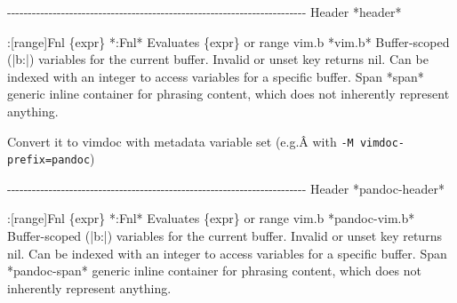 \documentclass[
]{article}
\newenvironment{Shaded}{}{}
\newcommand{\NormalTok}[1]{#1}
\begin{document}
\begin{Shaded}
\begin{Highlighting}[]
\NormalTok{{-}{-}{-}{-}{-}{-}{-}{-}{-}{-}{-}{-}{-}{-}{-}{-}{-}{-}{-}{-}{-}{-}{-}{-}{-}{-}{-}{-}{-}{-}{-}{-}{-}{-}{-}{-}{-}{-}{-}{-}{-}{-}{-}{-}{-}{-}{-}{-}{-}{-}{-}{-}{-}{-}{-}{-}{-}{-}{-}{-}{-}{-}{-}{-}{-}{-}{-}{-}{-}{-}{-}{-}}
\NormalTok{Header                                                            *header*}

\NormalTok{:[range]Fnl \{expr\}                                                  *:Fnl*}
\NormalTok{    Evaluates \{expr\} or range}
\NormalTok{\textasciigrave{}vim.b\textasciigrave{}                                                            *vim.b*}
\NormalTok{    Buffer{-}scoped (|b:|) variables for the current buffer. Invalid or}
\NormalTok{    unset key returns \textasciigrave{}nil\textasciigrave{}. Can be indexed with an integer to access}
\NormalTok{    variables for a specific buffer.}
\NormalTok{Span                                                                *span*}
\NormalTok{    generic inline container for phrasing content, which does not}
\NormalTok{    inherently represent anything.}
\end{Highlighting}
\end{Shaded}

Convert it to vimdoc with metadata variable set (e.g.Â with
\texttt{-M\ vimdoc-prefix=pandoc})

\begin{Shaded}
\begin{Highlighting}[]
\NormalTok{{-}{-}{-}{-}{-}{-}{-}{-}{-}{-}{-}{-}{-}{-}{-}{-}{-}{-}{-}{-}{-}{-}{-}{-}{-}{-}{-}{-}{-}{-}{-}{-}{-}{-}{-}{-}{-}{-}{-}{-}{-}{-}{-}{-}{-}{-}{-}{-}{-}{-}{-}{-}{-}{-}{-}{-}{-}{-}{-}{-}{-}{-}{-}{-}{-}{-}{-}{-}{-}{-}{-}{-}}
\NormalTok{Header                                                     *pandoc{-}header*}

\NormalTok{:[range]Fnl \{expr\}                                                  *:Fnl*}
\NormalTok{    Evaluates \{expr\} or range}
\NormalTok{\textasciigrave{}vim.b\textasciigrave{}                                                     *pandoc{-}vim.b*}
\NormalTok{    Buffer{-}scoped (|b:|) variables for the current buffer. Invalid or}
\NormalTok{    unset key returns \textasciigrave{}nil\textasciigrave{}. Can be indexed with an integer to access}
\NormalTok{    variables for a specific buffer.}
\NormalTok{Span                                                         *pandoc{-}span*}
\NormalTok{    generic inline container for phrasing content, which does not}
\NormalTok{    inherently represent anything.}
\end{Highlighting}
\end{Shaded}
\end{document}
